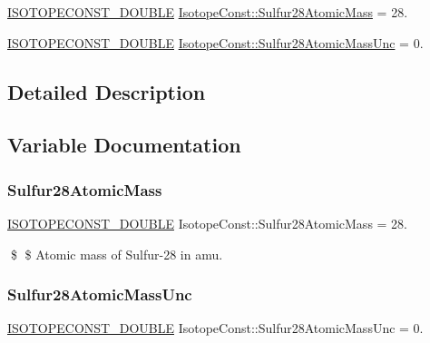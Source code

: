 \begin{DoxyCompactItemize}
\item 
\mbox{\hyperlink{group___isotope_const-_macros_ga8f45a7272ce02c0b4c65c44636ed719a}{I\+S\+O\+T\+O\+P\+E\+C\+O\+N\+S\+T\+\_\+\+D\+O\+U\+B\+LE}} \mbox{\hyperlink{group___isotope_const-_sulfur-_s28_ga264613951f7db640ec3511615c2c3311}{Isotope\+Const\+::\+Sulfur28\+Atomic\+Mass}} = 28.
\item 
\mbox{\hyperlink{group___isotope_const-_macros_ga8f45a7272ce02c0b4c65c44636ed719a}{I\+S\+O\+T\+O\+P\+E\+C\+O\+N\+S\+T\+\_\+\+D\+O\+U\+B\+LE}} \mbox{\hyperlink{group___isotope_const-_sulfur-_s28_ga8e4cb727e4e110aaac984e7a7359f72c}{Isotope\+Const\+::\+Sulfur28\+Atomic\+Mass\+Unc}} = 0.
\end{DoxyCompactItemize}


\subsection{Detailed Description}


\subsection{Variable Documentation}
\mbox{\label{group___isotope_const-_sulfur-_s28_ga264613951f7db640ec3511615c2c3311}} 
\subsubsection{\texorpdfstring{Sulfur28\+Atomic\+Mass}{Sulfur28AtomicMass}}
{\footnotesize\ttfamily \mbox{\hyperlink{group___isotope_const-_macros_ga8f45a7272ce02c0b4c65c44636ed719a}{I\+S\+O\+T\+O\+P\+E\+C\+O\+N\+S\+T\+\_\+\+D\+O\+U\+B\+LE}} Isotope\+Const\+::\+Sulfur28\+Atomic\+Mass = 28.}

\$ \$ Atomic mass of Sulfur-\/28 in amu. \mbox{\label{group___isotope_const-_sulfur-_s28_ga8e4cb727e4e110aaac984e7a7359f72c}} 
\subsubsection{\texorpdfstring{Sulfur28\+Atomic\+Mass\+Unc}{Sulfur28AtomicMassUnc}}
{\footnotesize\ttfamily \mbox{\hyperlink{group___isotope_const-_macros_ga8f45a7272ce02c0b4c65c44636ed719a}{I\+S\+O\+T\+O\+P\+E\+C\+O\+N\+S\+T\+\_\+\+D\+O\+U\+B\+LE}} Isotope\+Const\+::\+Sulfur28\+Atomic\+Mass\+Unc = 0.}

